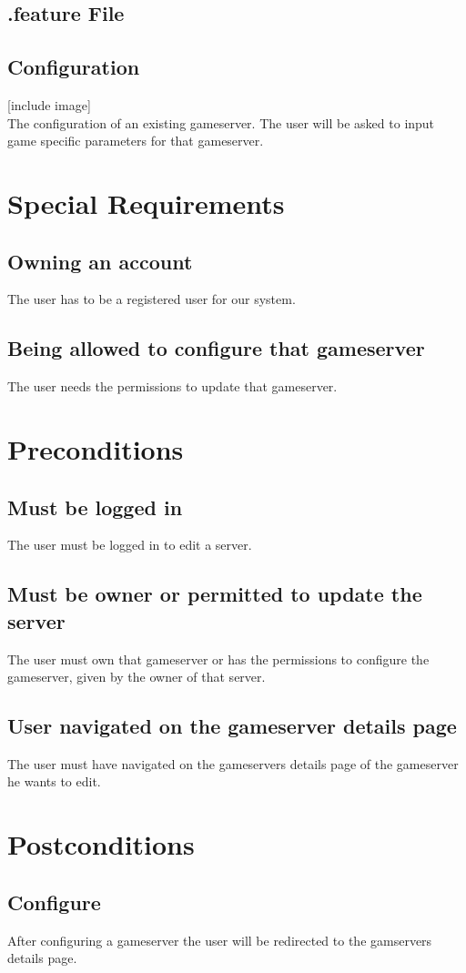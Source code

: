 \documentclass[a4paper,12pt,chapterprefix=false,bibliography=totoc,listof=totoc,]{scrreprt}
\begin{document}
\section{.feature File}
\begin{minipage}{\textwidth}

\end{minipage}

\section{Configuration}
[include image]\\
The configuration of an existing gameserver. The user will be asked to input game specific parameters for that gameserver.

\chapter{Special Requirements}

\section{Owning an account}
The user has to be a registered user for our system.

\section{Being allowed to configure that gameserver}
The user needs the permissions to update that gameserver.

\chapter{Preconditions}
\section{Must be logged in}
The user must be logged in to edit a server.

\section{Must be owner or permitted to update the server}
The user must own that gameserver or has the permissions to configure the gameserver, given by the owner of that server.

\section{User navigated on the gameserver details page}
The user must have navigated on the gameservers details page of the gameserver he wants to edit.

\chapter{Postconditions}

\section{Configure}
After configuring a gameserver the user will be redirected to the gamservers details page.
\end{document}
